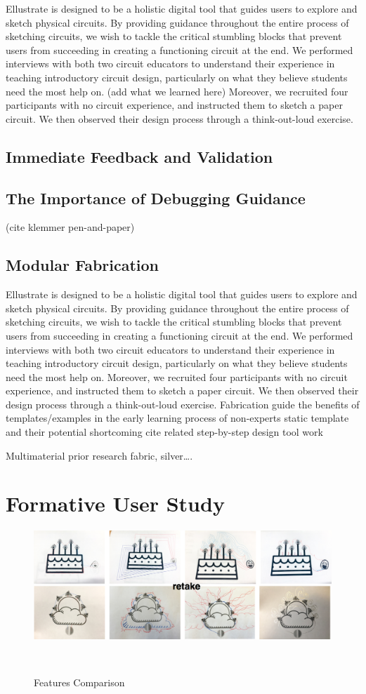 \documentclass{sigchi}
\begin{document}
Ellustrate is designed to be a holistic digital tool that guides users to explore and sketch physical circuits. By providing guidance throughout the entire process of sketching circuits, we wish to tackle the critical stumbling blocks that prevent users from succeeding in creating a functioning circuit at the end. We performed interviews with both two circuit educators to understand their experience in teaching introductory circuit design, particularly on what they believe students need the most help on. (add what we learned here) Moreover, we recruited four participants with no circuit experience, and instructed them to sketch a paper circuit. We then observed their design process through a think-out-loud exercise. 
\subsection{Immediate Feedback and Validation}

\subsection{The Importance of Debugging Guidance}
(cite klemmer pen-and-paper)
\subsection{Modular Fabrication}
Ellustrate is designed to be a holistic digital tool that guides users to explore and sketch physical circuits. By providing guidance throughout the entire process of sketching circuits, we wish to tackle the critical stumbling blocks that prevent users from succeeding in creating a functioning circuit at the end. We performed interviews with both two circuit educators to understand their experience in teaching introductory circuit design, particularly on what they believe students need the most help on.  Moreover, we recruited four participants with no circuit experience, and instructed them to sketch a paper circuit. We then observed their design process through a think-out-loud exercise. 
Fabrication guide 
the benefits of templates/examples in the early learning process of non-experts
static template and their potential shortcoming 
cite related step-by-step design tool work 

Multimaterial prior research 
fabric, silver….
\section{Formative User Study}
\begin{figure}
\centering
  \includegraphics[width=1\columnwidth]{figures/formative_user_design}
  \caption{Features Comparison}~\label{fig:formative_user_design}
\end{figure}
\end{document}
